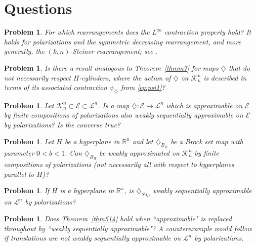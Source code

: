 \documentclass[12pt,reqno]{amsart}
\newcommand{\R}{{\mathbb R}}
\newcommand{\cK}{\mathcal K}
\newcommand{\cL}{\mathcal L}
\newcommand{\cE}{{\mathcal E}}
\newtheorem{prob}[thm]{Problem}
\newcommand{\di}{\diamondsuit}
\numberwithin{equation}{section}
\begin{document}
\section{Questions}\label{Questions}

\begin{prob}\label{prob522}
{\em For which rearrangements does the $L^{\infty}$ contraction property hold?  It holds for polarizations and the symmetric decreasing rearrangement, and more generally, the $(k,n)$-Steiner rearrangement; see \cite[Corollary~2.23 and Theorem~6.14]{Baer}.}
\end{prob}

\begin{prob}\label{prob2}
{\em Is there a result analogous to Theorem~\ref{thmm7} for maps $\di$ that do not necessarily respect $H$-cylinders, where the action of $\di$ on ${\cK}^n_n$ is described in terms of its associated contraction $\psi_{\di}$ from \eqref{eq:psi1}? }
\end{prob}

\begin{prob}\label{prob3}
{\em Let $\cK^n_n\subset \cE\subset \cL^n$.  Is a map $\di:\cE\to \cL^n$ which is approximable on $\cE$ by finite compositions of polarizations also weakly sequentially approximable on $\cE$ by polarizations?  Is the converse true?}
\end{prob}

\begin{prob}\label{prob4}
{\em Let $H$ be a hyperplane in $\R^n$ and let $\di_{B_H}$ be a Brock set map with parameter $0<b<1$.  Can $\di_{B_H}$ be weakly approximated on $\cK_n^n$ by finite compositions of polarizations (not necessarily all with respect to hyperplanes parallel to $H$)?}
\end{prob}

\begin{prob}\label{prob6}
{\em If $H$ is a hyperplane in $\R^n$, is $\di_{So_H}$ weakly sequentially approximable on ${\cL}^n$ by polarizations?}
\end{prob}

\begin{prob}\label{probTranslation}
{\em Does Theorem~\ref{thm514} hold when ``approximable" is replaced throughout by ``weakly sequentially approximable"?  A counterexample would follow if translations are not weakly sequentially approximable on $\cL^n$ by polarizations.}
\end{prob}
\end{document}
